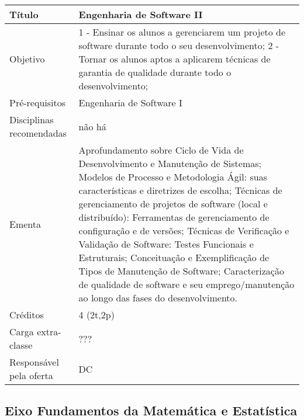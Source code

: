 \begin{center}
\begin{tabular}{|p{4.5cm}|p{10.0cm}|} \hline
Título & Engenharia de Software II \\ \hline
Objetivo &

1 - Ensinar os alunos a gerenciarem um projeto de software durante todo o seu desenvolvimento;
2 - Tornar os alunos aptos a aplicarem técnicas de garantia de qualidade durante todo o desenvolvimento;


\\ \hline
Pré-requisitos & Engenharia de Software I

\\ \hline
Disciplinas recomendadas & não há \\ 

\hline
Ementa & Aprofundamento sobre Ciclo de Vida de Desenvolvimento e Manutenção de Sistemas; Modelos de Processo e Metodologia Ágil: suas características e diretrizes de escolha; Técnicas de gerenciamento de projetos de software (local e distribuído): Ferramentas de gerenciamento de configuração e de versões; Técnicas de Verificação e Validação de Software: Testes Funcionais e Estruturais; Conceituação e Exemplificação de Tipos de Manutenção de Software; Caracterização de qualidade de software e seu emprego/manutenção ao longo das fases do desenvolvimento.



\\ \hline
Créditos & 4 (2t,2p) \\ \hline
Carga extra-classe & ???

\\ \hline
Responsável pela oferta & DC \\ \hline
\end{tabular}
\end{center}





\subsection{Eixo Fundamentos da Matemática e Estatística}


